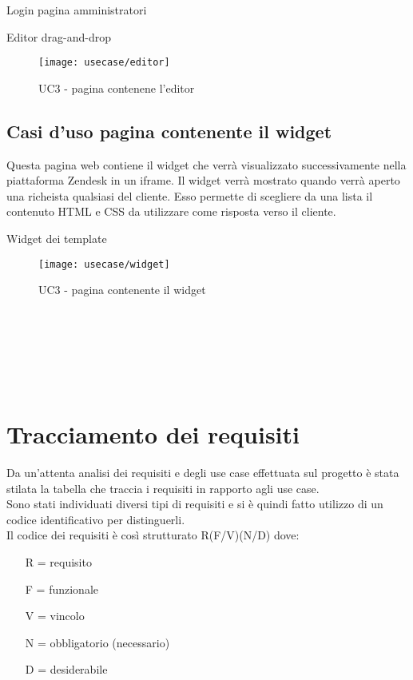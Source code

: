 \begin{usecase}{1}{Login pagina amministratori}
\begin{usecase}{3}{Editor drag-and-drop}
	\begin{figure}[!h] 
		\centering 
		\texttt{[image: usecase/editor]} 
		\caption{UC3 - pagina contenene l'editor}
	\end{figure}
\end{usecase}
\newpage
\subsection{ Casi d'uso pagina contenente il widget}
Questa pagina web contiene il widget che verrà visualizzato successivamente nella piattaforma Zendesk in un iframe. Il widget verrà mostrato quando verrà aperto una richeista qualsiasi del cliente. Esso permette di scegliere da una lista il contenuto HTML e CSS da utilizzare come risposta verso il cliente. 
\begin{usecase}{4}{Widget dei template}
	
	\begin{figure}[!h] 
		\centering 
		\texttt{[image: usecase/widget]} 
		\caption{UC3 - pagina contenente il widget}
	\end{figure}
\\
\\
\\
\\
\\
\end{usecase}

\section{Tracciamento dei requisiti}

Da un'attenta analisi dei requisiti e degli use case effettuata sul progetto è stata stilata la tabella che traccia i requisiti in rapporto agli use case.\\
Sono stati individuati diversi tipi di requisiti e si è quindi fatto utilizzo di un codice identificativo per distinguerli.\\
Il codice dei requisiti è così strutturato R(F/V)(N/D) dove:
\begin{enumerate}
	\item[R =] requisito
    \item[F =] funzionale
    \item[V =] vincolo
    \item[N =] obbligatorio (necessario)
    \item[D =] desiderabile
\end{enumerate}


\end{usecase}

